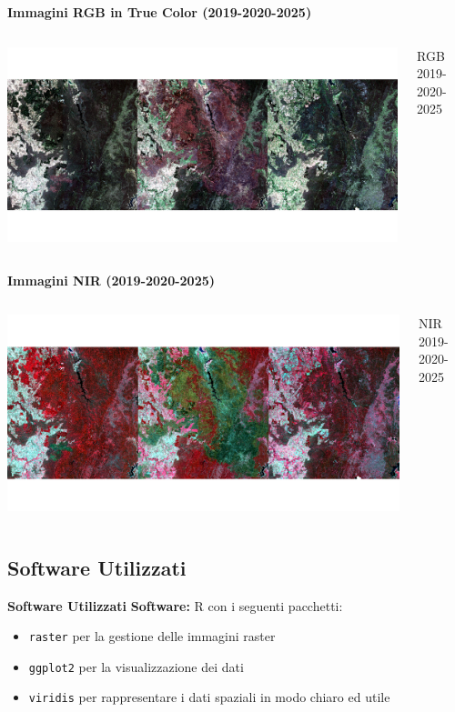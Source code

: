 \documentclass{beamer}
\begin{document}
\begin{frame}{\textbf{Immagini RGB in True Color (2019-2020-2025)}}
\begin{columns}
    \centering
    \includegraphics[width=\textwidth]{RGB_comparison.png}
    \caption{RGB 2019-2020-2025}
\end{columns}
\end{frame}

\begin{frame}{\textbf{Immagini NIR (2019-2020-2025)}}
\begin{columns}
    \centering
    \includegraphics[width=\textwidth]{RGB_comparison_2.png}
    \caption{NIR 2019-2020-2025}
\end{columns}
\end{frame}

\subsection{Software Utilizzati}

\begin{frame}{\textbf{Software Utilizzati}}
\textbf{Software:} R con i seguenti pacchetti:
\begin{itemize}
    \item \texttt{raster}{ per la gestione delle immagini raster}
    \item \texttt{ggplot2}{ per la visualizzazione dei dati}
    \item \texttt{viridis}{ per rappresentare i dati spaziali in modo chiaro ed utile}
\end{itemize}
\end{frame}
\end{document}
